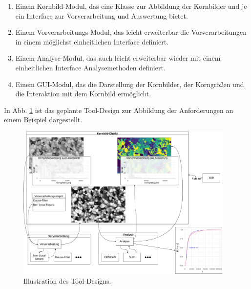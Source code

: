 \documentclass[
  12pt,
  openany]{book}
\providecommand{\tightlist}{%
  \setlength{\itemsep}{0pt}\setlength{\parskip}{0pt}}
\begin{document}
\begin{enumerate}
\def\labelenumi{\arabic{enumi}.}
\tightlist
\item
  Einem Kornbild-Modul, das eine Klasse zur Abbildung der Kornbilder und je ein Interface zur Vorverarbeitung und Auswertung bietet.
\item
  Einem Vorverarbeitungs-Modul, das leicht erweiterbar die Vorverarbeitungen in einem möglichst einheitlichen Interface definiert.
\item
  Einem Analyse-Modul, das auch leicht erweiterbar wieder mit einem einheitlichen Interface Analysemethoden definiert.
\item
  Einem GUI-Modul, das die Darstellung der Kornbilder, der Korngrößen und die Interaktion mit dem Kornbild ermöglicht.
\end{enumerate}

In Abb. \ref{fig:designGraph} ist das geplante Tool-Design zur Abbildung der Anforderungen an einem Beispiel dargestellt.





\begin{figure}

{\centering \includegraphics[width=0.96\textwidth]{../imgs/design} 

}

\caption[Illustration des Tool-Designs.]{Illustration des Tool-Designs.}\label{fig:designGraph}
\end{figure}
\end{document}
